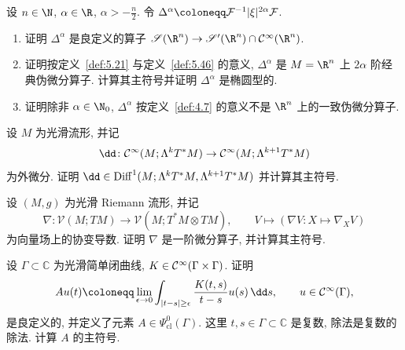 \begin{exer}\label{ex:5.19}
设 $n \in \N$, $\alpha \in \R$, $\alpha > -\frac{n}{2}$. 令 $\Delta^\alpha \defeq \mathcal{F}^{-1} |\xi|^{2\alpha} \mathcal{F}$.
\begin{enumerate}
    \item 证明 $\Delta^\alpha$ 是良定义的算子 $\mathscr{S}(\R^n) \to \mathscr{S}'(\R^n) \cap \Smooth(\R^n)$.
    \item 证明按定义~\ref{def:5.21} 与定义~\ref{def:5.46} 的意义, $\Delta^\alpha$ 是 $M = \R^n$ 上 $2\alpha$ 阶经典伪微分算子. 计算其主符号并证明 $\Delta^\alpha$ 是椭圆型的.
    \item 证明除非 $\alpha \in \N_0$, $\Delta^\alpha$ 按定义~\ref{def:4.7} 的意义不是 $\R^n$ 上的一致伪微分算子.
\end{enumerate}
\end{exer}

\begin{exer}[$k$-形式上的外微分]\label{ex:5.20}
设 $M$ 为光滑流形, 并记
\begin{equation}\label{eq:5.218}
    \dd \colon \Smooth(M; \Lambda^k T^* M) \to \Smooth(M; \Lambda^{k+1} T^* M)
\end{equation}
为外微分. 证明 $\dd \in \Diff^1(M; \Lambda^k T^* M, \Lambda^{k+1} T^* M)$ 并计算其主符号.
\end{exer}

\begin{exer}[协变导数]\label{ex:5.21}
设 $(M, g)$ 为光滑 Riemann 流形, 并记
\begin{equation}\label{eq:5.219}
    \nabla \colon \mathcal{V}(M; TM) \to \mathcal{V}(M; T^* M \otimes TM), \qquad V \mapsto (\nabla V \colon X \mapsto \nabla_X V)
\end{equation}
为向量场上的协变导数. 证明 $\nabla$ 是一阶微分算子, 并计算其主符号.
\end{exer}

\begin{exer}[一个经典伪微分算子]\label{ex:5.22}
设 $\Gamma \subset \mathbb{C}$ 为光滑简单闭曲线, $K \in \mathcal{C}^\infty(\Gamma \times \Gamma)$. 证明
\begin{equation}\label{eq:5.220}
    A u(t) \defeq \lim_{\epsilon \to 0} \int_{|t - s| \ge \epsilon} \frac{K(t, s)}{t - s} u(s) \,\dd s, \qquad u \in \Smooth(\Gamma),
\end{equation}
是良定义的, 并定义了元素 $A \in \Psi_{\mathrm{cl}}^0(\Gamma)$. 这里 $t, s \in \Gamma \subset \mathbb{C}$ 是复数, 除法是复数的除法. 计算 $A$ 的主符号.
\end{exer}

